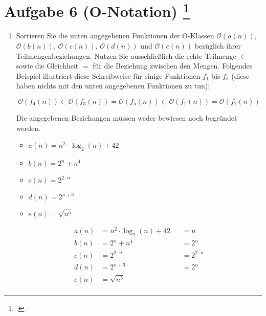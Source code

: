 \documentclass{bschlangaul-aufgabe}
\begin{document}
\section{Aufgabe 6 (O-Notation)
\footcite{examen:66115:2019:09}}

\begin{enumerate}


\item Sortieren Sie die unten angegebenen Funktionen der O-Klassen
$\mathcal{O}(a(n))$, $\mathcal{O}(b(n))$, $\mathcal{O}(c(n))$,
$\mathcal{O}(d(n))$ und $\mathcal{O}(e(n))$ bezüglich ihrer
Teilmengenbeziehungen. Nutzen Sie ausschließlich die echte Teilmenge
$\subset$ sowie die Gleichheit $=$ für die Beziehung zwischen den
Mengen. Folgendes Beispiel illustriert diese Schreibweise für einige
Funktionen $f_1$ bis $f_5$ (diese haben nichts mit den unten angegebenen
Funktionen zu tun):

\begin{displaymath}
\mathcal{O}(f_4 (n)) \subset \mathcal{O}(f_3(n)) = \mathcal{O}(f_5(n)) \subset \mathcal{O}(f_1(n)) = \mathcal{O}(f_2(n))
\end{displaymath}

Die angegebenen Beziehungen müssen weder bewiesen noch begründet werden.

\begin{itemize}
\item $a(n) = n^2 \cdot \log_2(n) + 42$
\item $b(n) = 2^n + n^4$
\item $c(n) = 2^{2 \cdot n}$
\item $d(n) = 2^{n+3}$
\item $e(n) = \sqrt{n^5}$
\end{itemize}

\begin{bAntwort}
\begin{align*}
a(n) &= n^2 \cdot \log_2(n) + 42 &&= n\\
b(n) &= 2^n + n^4 &&= 2^n\\
c(n) &= 2^{2 \cdot n} &&=2^{2 \cdot n}\\
d(n) &= 2^{n+3} &&= 2^n\\
e(n) &= \sqrt{n^5}\\
\end{align*}


\end{bAntwort}
\end{enumerate}
\end{document}
